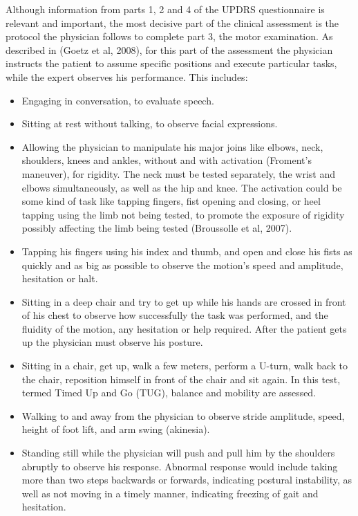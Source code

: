 Although information from parts 1, 2 and 4 of the \gls{UPDRS} questionnaire is relevant and important, the most decisive part of the clinical assessment is the protocol the physician follows to complete part 3, the motor examination. As described in (Goetz et al, 2008), for this part of the assessment the physician instructs the patient to assume specific positions and execute particular tasks, while the expert observes his performance. This includes:
\begin{itemize}
\item Engaging in conversation, to evaluate speech.
\item Sitting at rest without talking, to observe facial expressions.
\item Allowing the physician to manipulate his major joins like elbows, neck, shoulders, knees and ankles, without and with activation (Froment's maneuver), for rigidity. The neck must be tested separately, the wrist and elbows simultaneously, as well as the hip and knee. The activation could be some kind of task like tapping fingers, fist opening and closing, or heel tapping using the limb not being tested, to promote the exposure of rigidity possibly affecting the limb being tested (Broussolle et al, 2007). 
\item Tapping his fingers using his index and thumb, and open and close his fists as quickly and as big as possible to observe the motion's speed and amplitude, hesitation or halt. 
\item Sitting in a deep chair and try to get up while his hands are crossed in front of his chest to observe how successfully the task was performed, and the fluidity of the motion, any hesitation or help required. After the patient gets up the physician must observe his posture. 
\item Sitting in a chair, get up, walk a few meters, perform a U-turn, walk back to the chair, reposition himself in front of the chair and sit again. In this test, termed  Timed Up and Go (\gls{TUG}), balance and mobility are assessed.
\item Walking to and away from the physician to observe stride amplitude, speed, height of foot lift, and arm swing (akinesia).
\item Standing still while the physician will push and pull him by the shoulders abruptly to observe his response. Abnormal response would include taking more than two steps backwards or forwards, indicating postural instability, as well as not moving in a timely manner, indicating freezing of gait and hesitation. 

\end{itemize}
